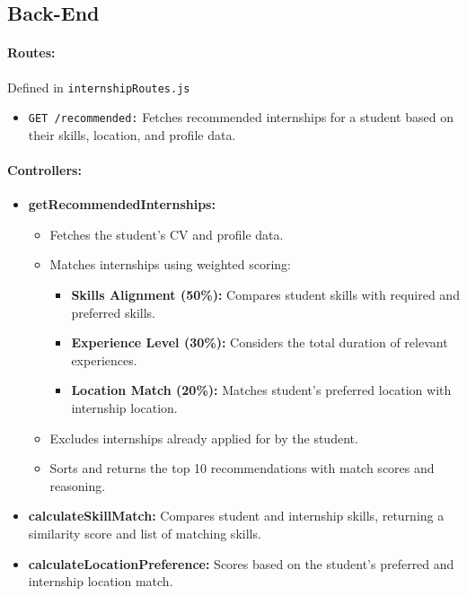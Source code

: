 \subsection*{Back-End}
\paragraph{Routes:} Defined in \texttt{internshipRoutes.js}
\begin{itemize}
    \item \texttt{GET /recommended:} Fetches recommended internships for a student based on their skills, location, and profile data.
\end{itemize}

\paragraph{Controllers:}
\begin{itemize}
    \item \textbf{getRecommendedInternships:}
    \begin{itemize}
        \item Fetches the student’s CV and profile data.
        \item Matches internships using weighted scoring:
        \begin{itemize}
            \item \textbf{Skills Alignment (50\%):} Compares student skills with required and preferred skills.
            \item \textbf{Experience Level (30\%):} Considers the total duration of relevant experiences.
            \item \textbf{Location Match (20\%):} Matches student’s preferred location with internship location.
        \end{itemize}
        \item Excludes internships already applied for by the student.
        \item Sorts and returns the top 10 recommendations with match scores and reasoning.
    \end{itemize}
    \item \textbf{calculateSkillMatch:} Compares student and internship skills, returning a similarity score and list of matching skills.
    \item \textbf{calculateLocationPreference:} Scores based on the student’s preferred and internship location match.
\end{itemize}

